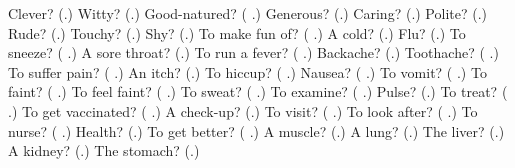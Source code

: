 \begin{tcolorbox}[breakable,colback=teal!4,colframe=teal!35!black,title={Before you move on}]
Clever? (\textbf{}.) Witty? (\textbf{}.) Good-natured? (\textbf{ }.) Generous? (\textbf{}.) Caring? (\textbf{}.) Polite? (\textbf{}.) Rude? (\textbf{}.) Touchy? (\textbf{}.) Shy? (\textbf{}.) To make fun of? (\textbf{ }.) A cold? (\textbf{}.) Flu? (\textbf{}.) To sneeze? (\textbf{ }.) A sore throat? (\textbf{}.) To run a fever? (\textbf{ }.) Backache? (\textbf{}.) Toothache? (\textbf{ }.) To suffer pain? (\textbf{ }.) An itch? (\textbf{}.) To hiccup? (\textbf{ }.) Nausea? (\textbf{ }.) To vomit? (\textbf{ }.) To faint? (\textbf{ }.) To feel faint? (\textbf{ }.) To sweat? (\textbf{ }.) To examine? (\textbf{ }.) Pulse? (\textbf{}.) To treat? (\textbf{ }.) To get vaccinated? (\textbf{ }.) A check-up? (\textbf{}.) To visit? (\textbf{ }.) To look after? (\textbf{ }.) To nurse? (\textbf{ }.) Health? (\textbf{}.) To get better? (\textbf{ }.) A muscle? (\textbf{}.) A lung? (\textbf{}.) The liver? (\textbf{}.) A kidney? (\textbf{}.) The stomach? (\textbf{}.)
\end{tcolorbox}
